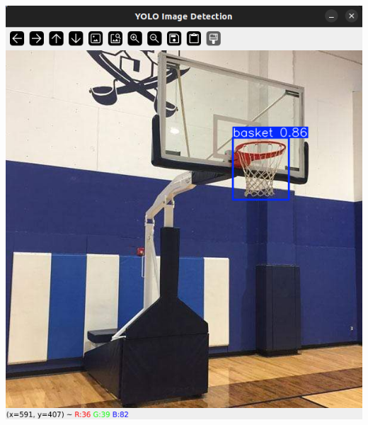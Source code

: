 \documentclass[a4paper]{article}
\begin{document}
\begin{multicols}{2}
{ \centering
  \includegraphics[scale=0.23]{../results/yolo_detection.png}\\
  \label{fig:basket_detection}
}


\end{multicols}
\end{document}
